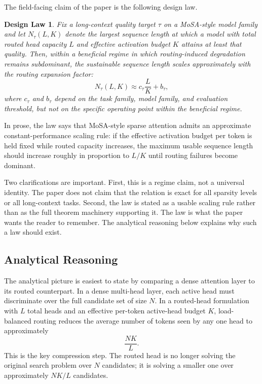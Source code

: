 \documentclass[11pt]{article}
\newtheorem{designlaw}{Design Law}
\begin{document}
The field-facing claim of the paper is the following design law.

\begin{designlaw}
Fix a long-context quality target $\tau$ on a MoSA-style model family and let $N_\tau(L,K)$ denote the largest sequence length at which a model with total routed head capacity $L$ and effective activation budget $K$ attains at least that quality. Then, within a beneficial regime in which routing-induced degradation remains subdominant, the sustainable sequence length scales approximately with the routing expansion factor:
\[
N_\tau(L,K) \approx c_\tau \frac{L}{K} + b_\tau,
\]
where $c_\tau$ and $b_\tau$ depend on the task family, model family, and evaluation threshold, but not on the specific operating point within the beneficial regime.
\end{designlaw}

In prose, the law says that MoSA-style sparse attention admits an approximate constant-performance scaling rule: if the effective activation budget per token is held fixed while routed capacity increases, the maximum usable sequence length should increase roughly in proportion to $L/K$ until routing failures become dominant.

Two clarifications are important. First, this is a regime claim, not a universal identity. The paper does not claim that the relation is exact for all sparsity levels or all long-context tasks. Second, the law is stated as a usable scaling rule rather than as the full theorem machinery supporting it. The law is what the paper wants the reader to remember. The analytical reasoning below explains why such a law should exist.

\subsection{Analytical Reasoning}

The analytical picture is easiest to state by comparing a dense attention layer to its routed counterpart. In a dense multi-head layer, each active head must discriminate over the full candidate set of size $N$. In a routed-head formulation with $L$ total heads and an effective per-token active-head budget $K$, load-balanced routing reduces the average number of tokens seen by any one head to approximately
\[
\frac{NK}{L}.
\]
This is the key compression step. The routed head is no longer solving the original search problem over $N$ candidates; it is solving a smaller one over approximately $NK/L$ candidates.
\end{document}
